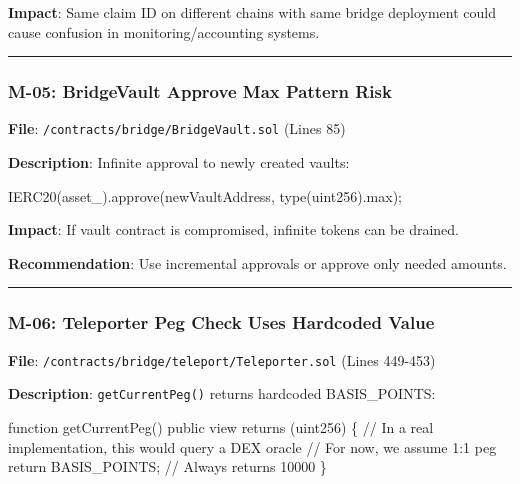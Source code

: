 \documentclass[
]{article}
\newenvironment{Shaded}{}{}
\newcommand{\NormalTok}[1]{#1}
\begin{document}
\textbf{Impact}: Same claim ID on different chains with same bridge
deployment could cause confusion in monitoring/accounting systems.

\begin{center}\rule{0.5\linewidth}{0.5pt}\end{center}

\subsubsection{M-05: BridgeVault Approve Max Pattern
Risk}\label{m-05-bridgevault-approve-max-pattern-risk}

\textbf{File}: \texttt{/contracts/bridge/BridgeVault.sol} (Lines 85)

\textbf{Description}: Infinite approval to newly created vaults:

\begin{Shaded}
\begin{Highlighting}[]
\NormalTok{IERC20(asset\_).approve(newVaultAddress, type(uint256).max);}
\end{Highlighting}
\end{Shaded}

\textbf{Impact}: If vault contract is compromised, infinite tokens can
be drained.

\textbf{Recommendation}: Use incremental approvals or approve only
needed amounts.

\begin{center}\rule{0.5\linewidth}{0.5pt}\end{center}

\subsubsection{M-06: Teleporter Peg Check Uses Hardcoded
Value}\label{m-06-teleporter-peg-check-uses-hardcoded-value}

\textbf{File}: \texttt{/contracts/bridge/teleport/Teleporter.sol} (Lines
449-453)

\textbf{Description}: \texttt{getCurrentPeg()} returns hardcoded
BASIS\_POINTS:

\begin{Shaded}
\begin{Highlighting}[]
\NormalTok{function getCurrentPeg() public view returns (uint256) \{}
\NormalTok{    // In a real implementation, this would query a DEX oracle}
\NormalTok{    // For now, we assume 1:1 peg}
\NormalTok{    return BASIS\_POINTS;  // Always returns 10000}
\NormalTok{\}}
\end{Highlighting}
\end{Shaded}
\end{document}
